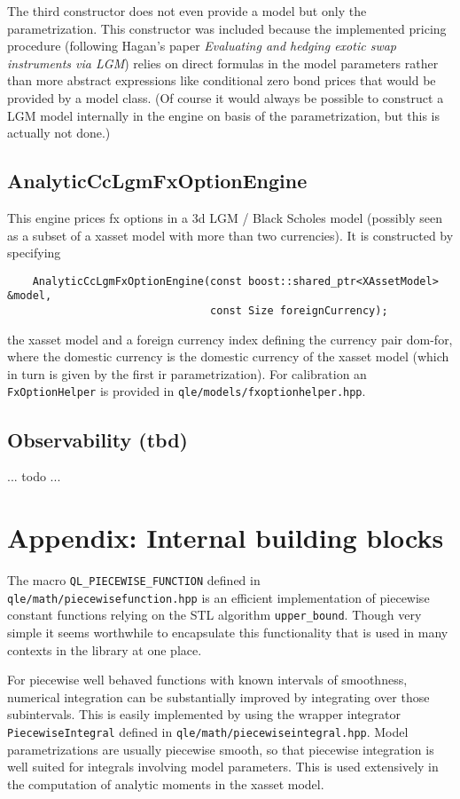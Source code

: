 \documentclass[12pt, a4paper]{article}
\begin{document}
The third constructor does not even provide a model but only the parametrization. This constructor was included because the implemented pricing procedure (following Hagan's paper \textit{Evaluating and hedging exotic swap instruments via LGM}) relies on direct formulas in the model parameters rather than more abstract expressions like conditional zero bond prices that would be provided by a model class. (Of course it would always be possible to construct a LGM model internally in the engine on basis of the parametrization, but this is actually not done.)

\subsection{AnalyticCcLgmFxOptionEngine}

This engine prices fx options in a 3d LGM / Black Scholes model (possibly seen as a subset of a xasset model with more than two currencies). It is constructed by specifying

\medskip
\scriptsize
\begin{verbatim}
    AnalyticCcLgmFxOptionEngine(const boost::shared_ptr<XAssetModel> &model,
                                const Size foreignCurrency);
\end{verbatim}
\normalsize
\medskip

the xasset model and a foreign currency index defining the currency pair dom-for, where the domestic currency is the domestic currency of the xasset model (which in turn is given by the first ir parametrization). For calibration an \verb+FxOptionHelper+ is provided in \verb+qle/models/fxoptionhelper.hpp+.

\subsection{Observability (tbd)}

... todo ...

\section{Appendix: Internal building blocks}

The macro \verb+QL_PIECEWISE_FUNCTION+ defined in \verb+qle/math/piecewisefunction.hpp+ is an efficient implementation of piecewise constant functions relying on the STL algorithm \verb+upper_bound+. Though very simple it seems worthwhile to encapsulate this functionality that is used in many contexts in the library at one place.

For piecewise well behaved functions with known intervals of smoothness, numerical integration can be substantially improved by integrating over those subintervals. This is easily implemented by using the wrapper integrator \verb+PiecewiseIntegral+ defined in \verb+qle/math/piecewiseintegral.hpp+. Model parametrizations are usually piecewise smooth, so that piecewise integration is well suited for integrals involving model parameters. This is used extensively in the computation of analytic moments in the xasset model.
\end{document}
